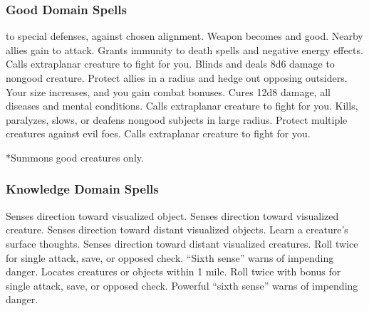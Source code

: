 \subsubsection{Good Domain Spells}

\begin{spelllist}
  \spellhead[1]{}
    to special defenses,  against chosen alignment.
   Weapon becomes  and good.
   Nearby allies gain  to attack.
   Grants immunity to death spells and negative energy effects.
   Calls extraplanar creature to fight for you.
  \spellhead[4]{}
   Blinds and deals 8d6 damage to nongood creature.
   Protect allies in a \areamed radius and hedge out opposing outsiders.
   Your size increases, and you gain combat bonuses.
   Cures 12d8 damage, all diseases and mental conditions.
   Calls extraplanar creature to fight for you.
  \F Kills, paralyzes, slows, or deafens nongood subjects in large radius.
  \spellhead[7]{}
  \spellhead[8]{}
   Protect multiple creatures against evil foes. 
  \spellhead[9]{}
   Calls extraplanar creature to fight for you.
\end{spelllist}
*Summons good creatures only.

\subsubsection{Knowledge Domain Spells}

\begin{spelllist}
   Senses direction toward visualized object.
  \spellhead[1]{}
   Senses direction toward visualized creature.
  \spellhead[2]{}
   Senses direction toward distant visualized objects.
   Learn a creature's surface thoughts.
   Senses direction toward distant visualized creatures.
   Roll twice for single attack, save, or opposed check.
   ``Sixth sense'' warns of impending danger.
  \spellhead[5]{}
   Locates creatures or objects within 1 mile.
  \spellhead[7]{}
   Roll twice with bonus for single attack, save, or opposed check.
  \spellhead[8]{}
  \spellhead[8]{}
   Powerful ``sixth sense'' warns of impending danger.
\end{spelllist}


